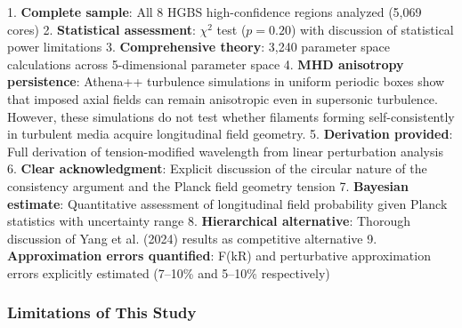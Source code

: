 \documentclass[11pt,a4paper]{article}
\begin{document}
1. \textbf{Complete sample}: All 8 HGBS high-confidence regions analyzed (5,069 cores)
2. \textbf{Statistical assessment}: $\chi^2$ test ($p=0.20$) with discussion of statistical power limitations
3. \textbf{Comprehensive theory}: 3,240 parameter space calculations across 5-dimensional parameter space
4. \textbf{MHD anisotropy persistence}: Athena++ turbulence simulations in uniform periodic boxes show that imposed axial fields can remain anisotropic even in supersonic turbulence. However, these simulations do not test whether filaments forming self-consistently in turbulent media acquire longitudinal field geometry.
5. \textbf{Derivation provided}: Full derivation of tension-modified wavelength from linear perturbation analysis
6. \textbf{Clear acknowledgment}: Explicit discussion of the circular nature of the consistency argument and the Planck field geometry tension
7. \textbf{Bayesian estimate}: Quantitative assessment of longitudinal field probability given Planck statistics with uncertainty range
8. \textbf{Hierarchical alternative}: Thorough discussion of Yang et al. (2024) results as competitive alternative
9. \textbf{Approximation errors quantified}: F(kR) and perturbative approximation errors explicitly estimated (7--10\% and 5--10\% respectively)

\subsubsection{Limitations of This Study}
\end{document}
